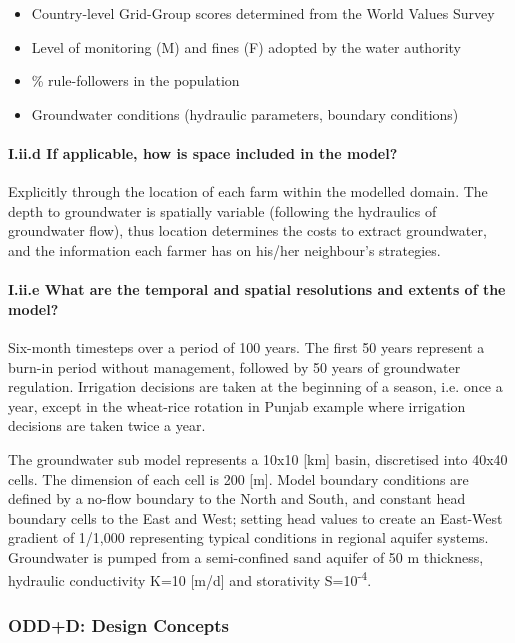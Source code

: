 \documentclass[12pt, a4paper]{article}
\begin{document}
\begin{itemize} \item Country-level Grid-Group scores determined from the World Values Survey \item Level of monitoring (M) and fines (F) adopted by the water authority \item \% rule-followers in the population \item Groundwater conditions (hydraulic parameters, boundary conditions) \end{itemize}

\paragraph{I.ii.d If applicable, how is space included in the model?}

Explicitly through the location of each farm within the modelled domain. The depth to groundwater is spatially variable (following the hydraulics of groundwater flow), thus location determines the costs to extract groundwater, and the information each farmer has on his/her neighbour's strategies.

\paragraph{I.ii.e What are the temporal and spatial resolutions and extents of the model?}

Six-month timesteps over a period of 100 years. The first 50 years represent a burn-in period without management, followed by 50 years of groundwater regulation. Irrigation decisions are taken at the beginning of a season, i.e. once a year, except in the wheat-rice rotation in Punjab example where irrigation decisions are taken twice a year.

The groundwater sub model represents a 10x10 [km] basin, discretised into 40x40 cells. The dimension of each cell is 200 [m]. Model boundary conditions are defined by a no-flow boundary to the North and South, and constant head boundary cells to the East and West; setting head values to create an East-West gradient of 1/1,000 representing typical conditions in regional aquifer systems. Groundwater is pumped from a semi-confined sand aquifer of 50 m thickness, hydraulic conductivity K=10 [m/d] and storativity S=10\textsuperscript{-4}.

\subsubsection{ODD+D: Design Concepts}
\end{document}
